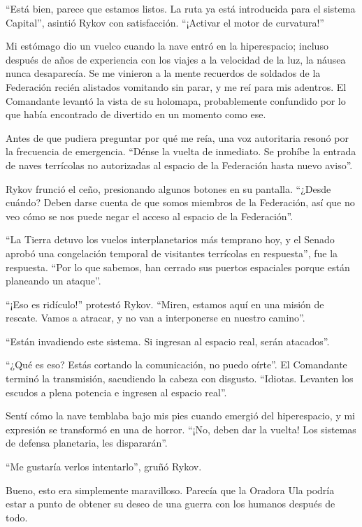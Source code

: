 \documentclass[spanish,12pt,a4paper,oneside,titlepage]{book}
\begin{document}
    ``Está bien, parece que estamos listos. La ruta ya está introducida para el sistema Capital'', asintió Rykov con satisfacción. ``¡Activar el motor de curvatura!''

    Mi estómago dio un vuelco cuando la nave entró en la hiperespacio; incluso después de años de experiencia con los viajes a la velocidad de la luz, la náusea nunca desaparecía. Se me vinieron a la mente recuerdos de soldados de la Federación recién alistados vomitando sin parar, y me reí para mis adentros. El Comandante levantó la vista de su holomapa, probablemente confundido por lo que había encontrado de divertido en un momento como ese.

    Antes de que pudiera preguntar por qué me reía, una voz autoritaria resonó por la frecuencia de emergencia. ``Dénse la vuelta de inmediato. Se prohíbe la entrada de naves terrícolas no autorizadas al espacio de la Federación hasta nuevo aviso''.

    Rykov frunció el ceño, presionando algunos botones en su pantalla. ``¿Desde cuándo? Deben darse cuenta de que somos miembros de la Federación, así que no veo cómo se nos puede negar el acceso al espacio de la Federación''.

    ``La Tierra detuvo los vuelos interplanetarios más temprano hoy, y el Senado aprobó una congelación temporal de visitantes terrícolas en respuesta'', fue la respuesta. ``Por lo que sabemos, han cerrado sus puertos espaciales porque están planeando un ataque''.

    ``¡Eso es ridículo!'' protestó Rykov. ``Miren, estamos aquí en una misión de rescate. Vamos a atracar, y no van a interponerse en nuestro camino''.

    ``Están invadiendo este sistema. Si ingresan al espacio real, serán atacados''.

    ``¿Qué es eso? Estás cortando la comunicación, no puedo oírte''. El Comandante terminó la transmisión, sacudiendo la cabeza con disgusto. ``Idiotas. Levanten los escudos a plena potencia e ingresen al espacio real''.

    Sentí cómo la nave temblaba bajo mis pies cuando emergió del hiperespacio, y mi expresión se transformó en una de horror. ``¡No, deben dar la vuelta! Los sistemas de defensa planetaria, les dispararán''.

    ``Me gustaría verlos intentarlo'', gruñó Rykov.

    Bueno, esto era simplemente maravilloso. Parecía que la Oradora Ula podría estar a punto de obtener su deseo de una guerra con los humanos después de todo.
\end{document}
